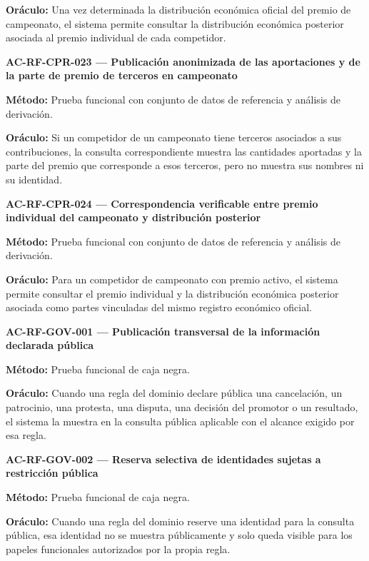 \documentclass[10pt,letterpaper]{article}
\begin{document}
\textbf{Oráculo:} Una vez determinada la distribución económica oficial del premio de campeonato, el sistema permite consultar la distribución económica posterior asociada al premio individual de cada competidor.\par\vspace{0.45em}
\noindent\textbf{AC-RF-CPR-023 --- Publicación anonimizada de las aportaciones y de la parte de premio de terceros en campeonato}\par
\textbf{Método:} Prueba funcional con conjunto de datos de referencia y análisis de derivación.\par
\textbf{Oráculo:} Si un competidor de un campeonato tiene terceros asociados a sus contribuciones, la consulta correspondiente muestra las cantidades aportadas y la parte del premio que corresponde a esos terceros, pero no muestra sus nombres ni su identidad.\par\vspace{0.45em}
\noindent\textbf{AC-RF-CPR-024 --- Correspondencia verificable entre premio individual del campeonato y distribución posterior}\par
\textbf{Método:} Prueba funcional con conjunto de datos de referencia y análisis de derivación.\par
\textbf{Oráculo:} Para un competidor de campeonato con premio activo, el sistema permite consultar el premio individual y la distribución económica posterior asociada como partes vinculadas del mismo registro económico oficial.\par\vspace{0.45em}
\noindent\textbf{AC-RF-GOV-001 --- Publicación transversal de la información declarada pública}\par
\textbf{Método:} Prueba funcional de caja negra.\par
\textbf{Oráculo:} Cuando una regla del dominio declare pública una cancelación, un patrocinio, una protesta, una disputa, una decisión del promotor o un resultado, el sistema la muestra en la consulta pública aplicable con el alcance exigido por esa regla.\par\vspace{0.45em}
\noindent\textbf{AC-RF-GOV-002 --- Reserva selectiva de identidades sujetas a restricción pública}\par
\textbf{Método:} Prueba funcional de caja negra.\par
\textbf{Oráculo:} Cuando una regla del dominio reserve una identidad para la consulta pública, esa identidad no se muestra públicamente y solo queda visible para los papeles funcionales autorizados por la propia regla.\par\vspace{0.45em}
\end{document}
